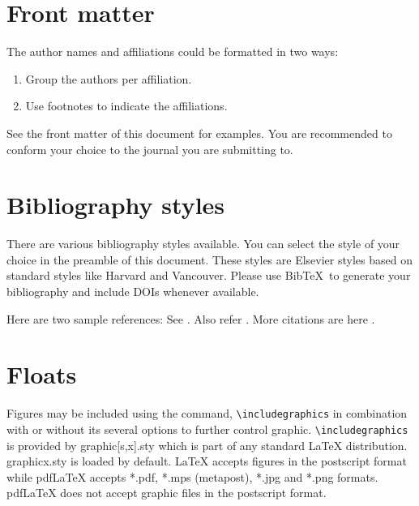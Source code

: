 \documentclass[a4paper,fleqn]{cas-sc}
\begin{document}
\section{Front matter}

The author names and affiliations could be formatted in two ways:
\begin{enumerate}[(1)]
\item Group the authors per affiliation.
\item Use footnotes to indicate the affiliations.
\end{enumerate}
See the front matter of this document for examples.
You are recommended to conform your choice to the journal you
are submitting to.

\section{Bibliography styles}

There are various bibliography styles available. You can select the
style of your choice in the preamble of this document. These styles are
Elsevier styles based on standard styles like Harvard and Vancouver.
Please use Bib\TeX\ to generate your bibliography and include DOIs
whenever available.

Here are two sample references:
See \citet{Fortunato2010}. Also refer \citet{Fortunato2010,NewmanGirvan2004}.
More citations are here \citep{Fortunato2010,Vehlowetal2013}.

\section{Floats}
{Figures} may be included using the command, \verb+\includegraphics+ in
combination with or without its several options to further control
graphic. \verb+\includegraphics+ is provided by {graphic[s,x].sty}
which is part of any standard \LaTeX{} distribution.
{graphicx.sty} is loaded by default. \LaTeX{} accepts figures in
the postscript format while pdf\LaTeX{} accepts {*.pdf},
{*.mps} (metapost), {*.jpg} and {*.png} formats.
pdf\LaTeX{} does not accept graphic files in the postscript format.

\end{document}
